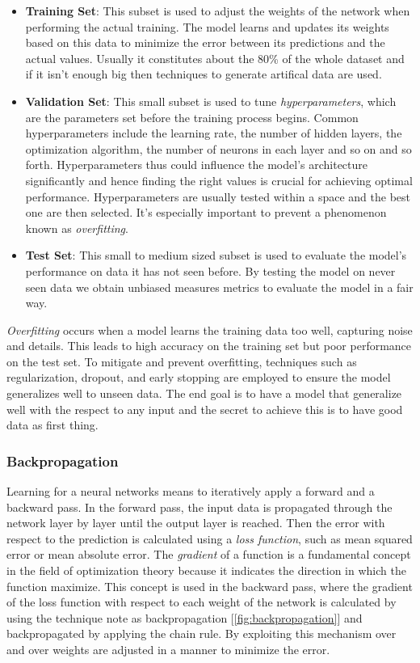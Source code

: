 \documentclass[../Thesis.tex]{subfiles}
\begin{document}
\begin{itemize}
	\item \textbf{Training Set}: This subset is used to adjust the weights of the network when performing the actual training. The model learns and updates its weights based on this data to minimize the error between its predictions and the actual values. Usually it constitutes about the 80\% of the whole dataset and if it isn't enough big then techniques to generate artifical data are used.
	
	\item \textbf{Validation Set}: This small subset is used to tune \emph{hyperparameters}, which are the parameters set before the training process begins. Common hyperparameters include the learning rate, the number of hidden layers, the optimization algorithm, the number of neurons in each layer and so on and so forth. Hyperparameters thus could influence the model's architecture significantly and hence finding the right values is crucial for achieving optimal performance. Hyperparameters are usually tested within a space and the best one are then selected. It's especially important to prevent a phenomenon known as \emph{overfitting}.
	
	\item \textbf{Test Set}: This small to medium sized subset is used to evaluate the model's performance on data it has not seen before. By testing the model on never seen data we obtain unbiased measures metrics to evaluate the model in a fair way.
\end{itemize}

\emph{Overfitting} occurs when a model learns the training data too well, capturing noise and details. This leads to high accuracy on the training set but poor performance on the test set. To mitigate and prevent overfitting, techniques such as regularization, dropout, and early stopping are employed to ensure the model generalizes well to unseen data. The end goal is to have a model that generalize well with the respect to any input and the secret to achieve this is to have good data as first thing.

	
	\subsubsection{Backpropagation}
	
	Learning for a neural networks means to iteratively apply a forward and a backward pass. In the forward pass, the input data is propagated through the network layer by layer until the output layer is reached. Then the error with respect to the prediction is calculated using a \emph{loss function}, such as mean squared error or mean absolute error. The \emph{gradient} of a function is a fundamental concept in the field of optimization theory because it indicates the direction in which the function maximize. This concept is used in the backward pass, where the gradient of the loss function with respect to each weight of the network is calculated by using the technique note as backpropagation [\autoref{fig:backpropagation}] and backpropagated by applying the chain rule. By exploiting this mechanism over and over weights are adjusted in a manner to minimize the error.
	
\end{document}
